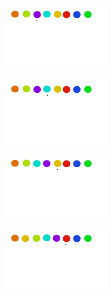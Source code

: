 \documentclass[12pt, fleqn]{report}                             %
\theoremstyle{break}                                            %
\begin{document}
    	\begin{figure}[h]
                        \centering
                        \includegraphics[width=0.4\textwidth]{graphics/Insertion-2.png}
                    \end{figure}
    
    	\begin{figure}[h]
                        \centering
                        \includegraphics[width=0.4\textwidth]{graphics/Insertion-3.png}
                    \end{figure}
    
    	\begin{figure}[h]
                        \centering
                        \includegraphics[width=0.4\textwidth]{graphics/Insertion-4.png}
                    \end{figure}
    
    	\begin{figure}[h]
                        \centering
                        \includegraphics[width=0.4\textwidth]{graphics/Insertion-5.png}
                    \end{figure}
                     \clearpage
                    
\end{document}
